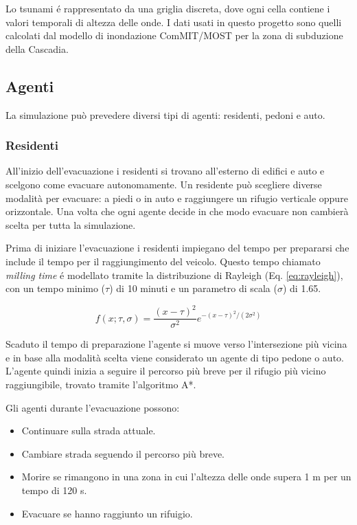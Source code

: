 Lo tsunami é rappresentato da una griglia discreta, dove ogni cella contiene i valori temporali di altezza delle onde.
I dati usati in questo progetto sono quelli calcolati dal modello di inondazione ComMIT/MOST \parencite{titov1997implementation} per la zona di subduzione della Cascadia.

\subsection{Agenti}
La simulazione può prevedere diversi tipi di agenti: residenti, pedoni e auto.

\subsubsection{Residenti}
All'inizio dell'evacuazione i residenti si trovano all'esterno di edifici e auto
e scelgono come evacuare autonomamente.
Un residente può scegliere diverse modalità per evacuare: a piedi o in auto e raggiungere un rifugio verticale oppure orizzontale.
Una volta che ogni agente decide in che modo evacuare non cambierà scelta per tutta la simulazione.

Prima di iniziare l'evacuazione i residenti impiegano del tempo per prepararsi
che include il tempo per il raggiungimento del veicolo.
%
Questo tempo chiamato \textit{milling time} é modellato tramite
la distribuzione di Rayleigh (Eq. \ref{eq:rayleigh}), con un tempo minimo ($\tau$) di 10 minuti
e un parametro di scala ($\sigma$) di 1.65.

\begin{equation}
  f(x; \tau, \sigma) = \frac{(x - \tau)^2}{\sigma^2}e^{-{(x - \tau)^2}/(2\sigma^2)}
  \label{eq:rayleigh}
\end{equation}

Scaduto il tempo di preparazione l'agente si muove verso l'intersezione più vicina e
in base alla modalità scelta viene considerato un agente di tipo pedone o auto.
L'agente quindi inizia a seguire il percorso più breve per il rifugio più vicino raggiungibile, trovato tramite l'algoritmo A*.

Gli agenti durante l'evacuazione possono:
\begin{itemize}
  \item Continuare sulla strada attuale.
  \item Cambiare strada seguendo il percorso più breve.
  \item Morire se rimangono in una zona in cui l'altezza delle onde supera 1 m per un tempo di 120 s.
  \item Evacuare se hanno raggiunto un rifuigio.
\end{itemize}

